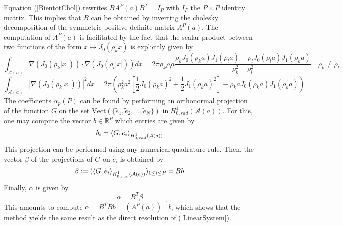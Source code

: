 \documentclass[11pt,a4paper]{article}
\begin{document}
Equation (\ref{BientotChol}) rewrites $BA^P(a)B^T = I_P$ with $I_P$ the $P \times P$ identity matrix. This implies that $B$ can be obtained by inverting the cholesky decomposition of the symmetric positive definite matrix $A^P(a)$.  
The computation of $A^P(a)$ is facilitated by the fact that the scalar product between two functions of the form $x \mapsto J_0(\rho_kx)$ is explicitly given by 
\[ \int_{\mathcal{A}(a)}\nabla \left(J_0(\rho_k|x|)\right)\cdot \nabla \left(J_0(\rho_l|x|)\right)dx = 2\pi\rho_k\rho_l a\dfrac{\rho_k J_0(\rho_ka)J_1(\rho_l a) - \rho_l J_0(\rho_la)J_1(\rho_k a)}{\rho_k^2 - \rho_l^2} \quad \rho_k \neq \rho_l\] 
\[ \int_{\mathcal{A}(a)}\left|\nabla \left(J_0(\rho_k|x|)\right)\right|^2dx = 2\pi \left(\rho_k^2 a^2 \left[\dfrac{1}{2}J_0(\rho_ka)^2+  \dfrac{1}{2}J_1(\rho_k a)^2\right]- \rho_k aJ_0(\rho_ka)J_1(\rho_ka)\right)\] 
The coefficients $\alpha_p(P)$ can be found by performing an orthonormal projection of the function $G$ on the set $\text{Vect}(\{\tilde{e}_1,\tilde{e}_2,...,\tilde{e}_N\})$ in $H^1_{0,rad}(\mathcal{A}(a))$. For this, one may compute the vector $b \in \mathbb{R}^P$ which entries are given by 
\[ b_i = \left\langle G,e_i\right\rangle_{H^1_{0,rad}(\mathcal{A}(a))}\]
This projection can be performed using any numerical quadrature rule. Then, the vector $\beta$ of the projections of $G$ on $\tilde{e}_i$ is obtained by 
\[\beta := (\left\langle G,\tilde{e}_i\right\rangle_{H^1_{0,rad}(\mathcal{A}(a))})_{1\leq i \leq P} = B b\]
Finally, $\alpha$ is given by 
\[\alpha = B^T \beta\]
This amounts to compute $\alpha = B^TB b = \left(A^P(a)\right)^{-1}b$, which shows that the method yields the same result as the direct resolution of (\ref{LinearSystem}). 
\end{document}
